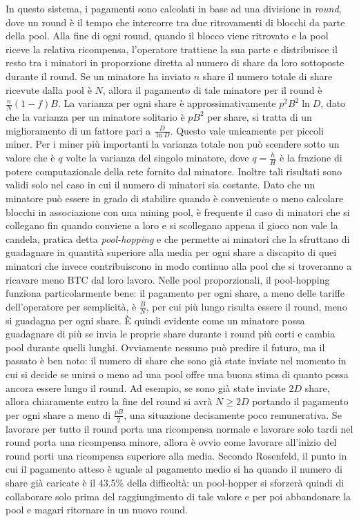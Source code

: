 In questo sistema, i pagamenti sono calcolati in base ad una divisione in \emph{round}, dove un round è il tempo che intercorre tra due ritrovamenti di blocchi da parte della pool. Alla fine di ogni round, quando il blocco viene ritrovato e la pool riceve la relativa ricompensa, l'operatore trattiene la sua parte e distribuisce il resto tra i minatori in proporzione diretta al numero di share da loro sottoposte durante il round. Se un minatore ha inviato $n$ share il numero totale di share ricevute dalla pool è $N$, allora il pagamento di tale minatore per il round è $\frac{n}{N}(1-f)B$.
La varianza per ogni share è approssimativamente $p^2 B^2 \ln{D}$, dato che la varianza per un minatore solitario è $pB^2$ per share, si tratta di un miglioramento di un fattore pari a $\frac{D}{\ln{D}}$. Questo vale unicamente per piccoli miner. Per i miner più importanti la varianza totale non può scendere sotto un valore che è $q$ volte la varianza del singolo minatore, dove $q=\frac{h}{H}$ è la frazione di potere computazionale della rete fornito dal minatore.
Inoltre tali risultati sono validi solo nel caso in cui il numero di minatori sia costante. Dato che un minatore può essere in grado di stabilire quando è conveniente o meno calcolare blocchi in associazione con una mining pool, è frequente il caso di minatori che si collegano fin quando conviene a loro e si scollegano appena il gioco non vale la candela, pratica detta \emph{pool-hopping} e che permette ai minatori che la sfruttano di guadagnare in quantità superiore alla media per ogni share a discapito di quei minatori che invece contribuiscono in modo continuo alla pool che si troveranno a ricavare meno BTC dal loro lavoro.
Nelle pool proporzionali, il pool-hopping funziona particolarmente bene: il pagamento per ogni share, a meno delle tariffe dell'operatore per semplicità, è $\frac{B}{N}$, per cui più lungo risulta essere il round, meno si guadagna per ogni share. È quindi evidente come un minatore possa guadagnare di più se invia le proprie share durante i round più corti e cambia pool durante quelli lunghi.
Ovviamente nessuno può predire il futuro, ma il passato è ben noto: il numero di share che sono già state inviate nel momento in cui si decide se unirsi o meno ad una pool offre una buona stima di quanto possa ancora essere lungo il round. Ad esempio, se sono già state inviate $2D$ share, allora chiaramente entro la fine del round si avrà $N \geq 2D$ portando il pagamento per ogni share a meno di $\frac{pB}{2}$, una situazione decisamente poco remunerativa.
Se lavorare per tutto il round porta una ricompensa normale e lavorare solo tardi nel round porta una ricompensa minore, allora è ovvio come lavorare all'inizio del round porti una ricompensa superiore alla media. Secondo Rosenfeld, il punto in cui il pagamento atteso è uguale al pagamento medio si ha quando il numero di share già caricate è il 43.5\% della difficoltà: un pool-hopper si sforzerà quindi di collaborare solo prima del raggiungimento di tale valore e per poi abbandonare la pool e magari ritornare in un nuovo round.

